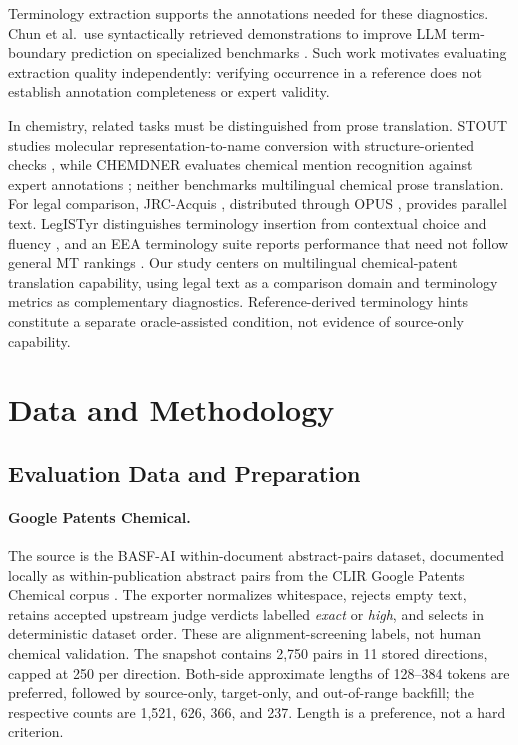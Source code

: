 \documentclass[11pt]{article}
\begin{document}
Terminology extraction supports the annotations needed for these diagnostics. Chun et al.\ use
syntactically retrieved demonstrations to improve LLM term-boundary prediction on specialized
benchmarks \cite{chun2025}. Such work motivates evaluating extraction quality independently:
verifying occurrence in a reference does not establish annotation completeness or expert validity.

In chemistry, related tasks must be distinguished from prose translation. STOUT studies molecular
representation-to-name conversion with structure-oriented checks \cite{rajan2021}, while CHEMDNER
evaluates chemical mention recognition against expert annotations \cite{krallinger2015}; neither
benchmarks multilingual chemical prose translation. For legal comparison, JRC-Acquis
\cite{steinberger2006}, distributed through OPUS \cite{tiedemann2012}, provides parallel text.
LegISTyr distinguishes terminology insertion from contextual choice and fluency \cite{dinatale2025},
and an EEA terminology suite reports performance that need not follow general MT rankings
\cite{hauksdottir2025}. Our study centers on multilingual chemical-patent translation capability,
using legal text as a comparison domain and terminology metrics as complementary diagnostics.
Reference-derived terminology hints constitute a separate oracle-assisted condition, not evidence
of source-only capability.

\section{Data and Methodology}
\label{sec:methods}

\subsection{Evaluation Data and Preparation}
\label{sec:data}

\paragraph{Google Patents Chemical.}
The source is the BASF-AI within-document abstract-pairs dataset, documented
locally as within-publication abstract pairs from the CLIR Google Patents Chemical corpus
\cite{basfpatents}. The exporter normalizes whitespace, rejects empty text, retains accepted upstream
judge verdicts labelled \emph{exact} or \emph{high}, and selects in deterministic dataset order.
These are alignment-screening labels, not human chemical validation. The snapshot contains 2,750
pairs in 11 stored directions, capped at 250 per direction. Both-side approximate lengths of
128--384 tokens are preferred, followed by source-only, target-only, and out-of-range backfill;
the respective counts are 1,521, 626, 366, and 237. Length is a preference, not a hard criterion.
\end{document}
